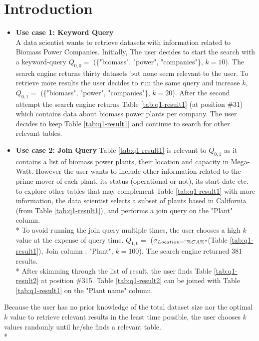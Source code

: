 \section{Introduction}
\label{sec:introduction}

\begin{itemize}
	\item \textbf{Use case 1: Keyword Query}\\
	 A data scientist wants to retrieve datasets with information related to Biomass Power Companies. Initially,  The user decides to start the search with a keyword-query $Q_{0,0} = $  (\{"biomass", "power", "companies"\}, $k = 10$). The search engine returns thirty datasets but none seem relevant to the user.
	 To retrieve more results the user decides to run the same query and increase $k$, $Q_{0,1} = $  (\{"biomass", "power", "companies"\}, $k = 20$). After the second attempt the search engine returns Table \ref{tab:q1-result1} (at position \#31) which contains data about biomass power plants per company. The user decides to keep Table \ref{tab:q1-result1} and continue to search for other relevant tables.\\
	
	\item \textbf{Use case 2: Join Query}
	Table \ref{tab:q1-result1} is relevant to $Q_{0,1}$ as it contains a list of biomass power plants, their location and capacity in Mega-Watt. However the user wants to include other information related to the prime mover of each plant, its status (operational or not), its start date etc.
	to explore other tables that may complement  Table \ref{tab:q1-result1} with more information, the data scientist selects a subset of plants based in California (from Table \ref{tab:q1-result1}),  and  performs a join query on the "Plant" column. \\*
	To avoid running the join query multiple times, the user chooses a high $k$ value at the expense of query time.
	$Q_{1,0} =$ ($\sigma_{Location = "\%CA\%"}$(Table \ref{tab:q1-result1}), Join column : "Plant", $k = 100$). The search engine returned $381$ results.\\* After skimming through the list of result, the user finds Table \ref{tab:q1-result2} at position \#315. Table \ref{tab:q1-result2} can be joined with Table \ref{tab:q1-result1} on the "Plant name" column. \\
	
\end{itemize}
Because the user has no prior knowledge of the total dataset size nor the optimal $k$ value to retrieve relevant results in the least time possible, the user chooses $k$ values randomly until he/she finds a relevant table.\\*
